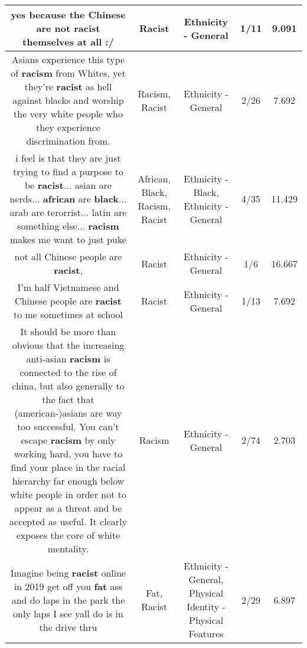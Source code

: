 \documentclass[11pt]{article}
\newlength\mylength
\begin{document}
\begin{center}
\begin{longtable}{|C{.65\mylength}|C{.30\mylength}|C{.12\mylength}|C{.12\mylength}|C{.12\mylength}|}
  \small yes because the Chinese are not \textbf{racist} themselves at all :/\normalsize   & Racist & Ethnicity - General & 1/11 & 9.091 \\  \hline
  \small Asians experience this type of \textbf{racism} from Whites, yet they're \textbf{racist} as hell against blacks and worship the very white people who they experience discrimination from.\normalsize   & Racism, Racist & Ethnicity - General & 2/26 & 7.692 \\  \hline
  \small i feel is that they are just trying to find a purpose to be \textbf{racist}... asian are nerds... \textbf{african} are \textbf{black}... arab are terorrist... latin are something else... \textbf{racism} makes me want to just puke\normalsize   & African, Black, Racism, Racist & Ethnicity - Black, Ethnicity - General & 4/35 & 11.429 \\  \hline
  \small not all Chinese people are \textbf{racist},\normalsize   & Racist & Ethnicity - General & 1/6 & 16.667 \\  \hline
  \small I'm half Vietnamese and Chinese people are \textbf{racist} to me sometimes at school\normalsize   & Racist & Ethnicity - General & 1/13 & 7.692 \\  \hline
  \small It should be more than obvious that the increasing anti-asian \textbf{racism} is connected to the rise of china, but also generally to the fact that (american-)asians are way too successful. You can't escape \textbf{racism} by only working hard, you have to find your place in the racial hierarchy far enough below white people in order not to appear as a threat and be accepted as useful. It clearly exposes the core of white mentality.\normalsize   & Racism & Ethnicity - General & 2/74 & 2.703 \\  \hline
  \small Imagine being \textbf{racist} online in 2019   get off you \textbf{fat} ass and do laps in the park the only laps I see yall do is in the drive thru\normalsize   & Fat, Racist & Ethnicity - General, Physical Identity - Physical Features & 2/29 & 6.897 \\  \hline

\end{longtable}
\end{center}
\end{document}
